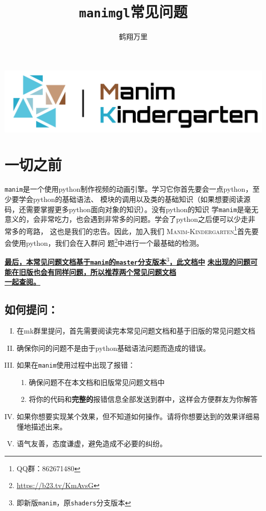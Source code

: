 \documentclass[cn,blue,14pt,normal]{elegantnote}
\title{\texttt{manimgl}常见问题}
\author{鹤翔万里}
\institute{\textsc{manim-kindergarten}}
\date{\zhtoday}
\begin{document}
	
\maketitle

\centerline{
	\includegraphics[height=3\baselineskip]{assets/Logo.png}
}

\newpage


\section*{一切之前}

\texttt{manim}是一个使用python制作视频的动画引擎。学习它你首先要会一点python，至少要学会python的基础语法、
模块的调用以及类的基础知识（如果想要阅读源码，还需要掌握更多python面向对象的知识）。没有python的知识
学\texttt{manim}是毫无意义的，会非常吃力，也会遇到非常多的问题。学会了python之后便可以少走非常多的弯路，
这也是我们的忠告。\quad 因此，加入我们
\textsc{Manim-Kindergarten}\footnote{QQ群：862671480}首先要会使用python，我们会在入群问
题\footnote{\url{https://b23.tv/KmAvsG}}中进行一个最基础的检测。

\textbf{\underline{最后，本常见问题文档基于\texttt{manim}的\texttt{master}分支版本}}\footnote{即新版\texttt{manim}，原\texttt{shaders}分支版本}\textbf{\underline{，此文档中}}
\textbf{\underline{未出现的问题可能在旧版也会有同样问题，所以推荐两个常见问题文档}}\\
\textbf{\underline{一起查阅。}}

\subsection*{如何提问：}

\begin{enumerate}[I.]
	\item 在mk群里提问，首先需要阅读完本常见问题文档和基于旧版的常见问题文档
	
	\item 确保你问的问题不是由于python基础语法问题而造成的错误。
	
	\item 如果在\texttt{manim}使用过程中出现了报错：
	
	\begin{enumerate}[1.]
		\item 确保问题不在本文档和旧版常见问题文档中
		\item 将你的代码和\textbf{完整的}报错信息全部发送到群中，这样会方便群友为你解答
	\end{enumerate}

	\item 如果你想要实现某个效果，但不知道如何操作。请将你想要达到的效果详细易懂地描述出来。
	\item 语气友善，态度谦虚，避免造成不必要的纠纷。
\end{enumerate}
\end{document}
